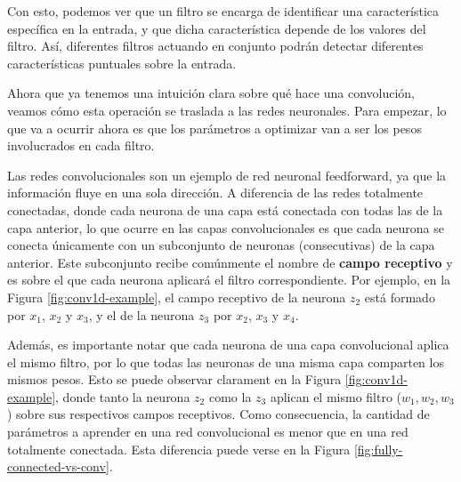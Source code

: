 \documentclass[../../main.tex]{subfiles}
\begin{document}
Con esto, podemos ver que un filtro se encarga de identificar una característica
específica en la entrada, y que dicha característica depende de los valores del filtro.
Así, diferentes filtros actuando en conjunto podrán detectar diferentes características
puntuales sobre la entrada.

Ahora que ya tenemos una intuición clara sobre qué hace una convolución, veamos cómo esta
operación se traslada a las redes neuronales. Para empezar, lo que va a ocurrir ahora es
que los parámetros a optimizar van a ser los pesos involucrados en cada filtro.

Las redes convolucionales son un ejemplo de red neuronal feedforward, ya que la
información fluye en una sola dirección. A diferencia de las redes totalmente conectadas,
donde cada neurona de una capa está conectada con todas las de la capa anterior, lo que
ocurre en las capas convolucionales es que cada neurona se conecta únicamente con un
subconjunto de neuronas (consecutivas) de la capa anterior. Este subconjunto recibe
comúnmente el nombre de \textbf{campo receptivo} y es sobre el que cada neurona aplicará
el filtro correspondiente. Por ejemplo, en la Figura \ref{fig:conv1d-example}, el campo
receptivo de la neurona \(z_2\) está formado por \(x_1\), \(x_2\) y \(x_3\), y el de la
neurona \(z_3\) por \(x_2\), \(x_3\) y \(x_4\).

Además, es importante notar que cada neurona de una capa convolucional aplica el mismo
filtro, por lo que todas las neuronas de una misma capa comparten los mismos pesos. Esto
se puede observar clarament en la Figura \ref{fig:conv1d-example}, donde tanto la neurona
\(z_2\) como la \(z_3\) aplican el mismo filtro (\(w_1, w_2, w_3\)) sobre sus respectivos
campos receptivos. Como consecuencia, la cantidad de parámetros a aprender en una red
convolucional es menor que en una red totalmente conectada. Esta diferencia puede verse en
la Figura \ref{fig:fully-connected-vs-conv}.
\end{document}
